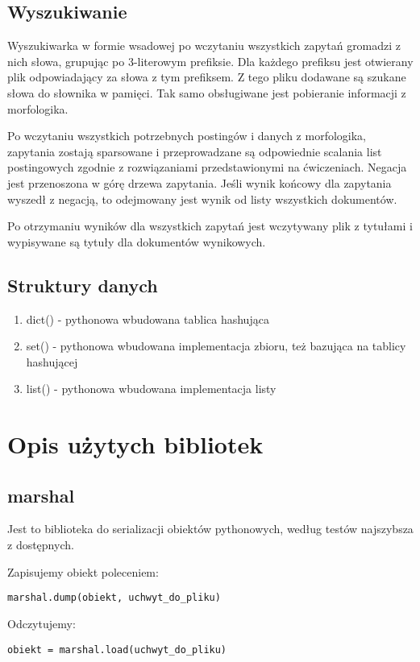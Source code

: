 \documentclass[11pt]{article}
\begin{document}
\subsection{Wyszukiwanie}
Wyszukiwarka w formie wsadowej po wczytaniu wszystkich zapytań gromadzi z nich słowa, grupując po 3-literowym prefiksie. Dla każdego prefiksu jest otwierany plik odpowiadający za słowa z tym prefiksem. Z tego pliku dodawane są szukane słowa do słownika w pamięci. Tak samo obsługiwane jest pobieranie informacji z morfologika.

Po wczytaniu wszystkich potrzebnych postingów i danych z morfologika, zapytania zostają sparsowane i przeprowadzane są odpowiednie scalania list postingowych zgodnie z rozwiązaniami przedstawionymi na ćwiczeniach. Negacja jest przenoszona w górę drzewa zapytania. Jeśli wynik końcowy dla zapytania wyszedł z negacją, to odejmowany jest wynik od listy wszystkich dokumentów.

Po otrzymaniu wyników dla wszystkich zapytań jest wczytywany plik z tytułami i wypisywane są tytuły dla dokumentów wynikowych.

\subsection{Struktury danych}
\begin{enumerate}
\item dict() - pythonowa wbudowana tablica hashująca
\item set() - pythonowa wbudowana implementacja zbioru, też bazująca na tablicy hashującej
\item list() - pythonowa wbudowana implementacja listy
\end{enumerate}

\section{Opis użytych bibliotek}

\subsection{marshal}
Jest to biblioteka do serializacji obiektów pythonowych, według testów najszybsza z dostępnych.

Zapisujemy obiekt poleceniem:
\begin{verbatim}
marshal.dump(obiekt, uchwyt_do_pliku)
\end{verbatim}
Odczytujemy:
\begin{verbatim}
obiekt = marshal.load(uchwyt_do_pliku)
\end{verbatim}
\end{document}
